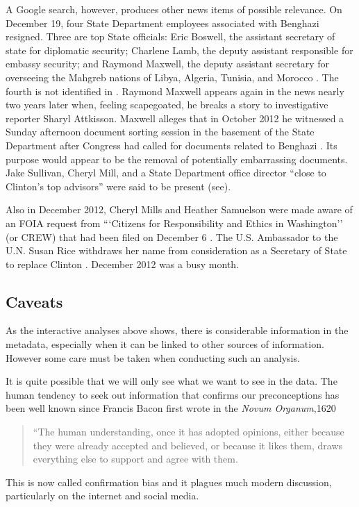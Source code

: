 \documentclass[journal]{vgtc}                %
\begin{document}
A Google search,  however, produces other news items of possible relevance.  On  December 19, four State Department employees associated with Benghazi resigned.  Three are top State officials: Eric Boswell,  the assistant secretary of state for diplomatic security;  Charlene Lamb, the deputy assistant responsible for embassy security; and Raymond Maxwell, the deputy assistant secretary for overseeing the Mahgreb nations of Libya, Algeria, Tunisia, and Morocco \cite{securityResigns, fourResign, tripoliPostResign}.  The fourth is not identified in \cite{fourResign, tripoliPostResign}.   Raymond Maxwell appears again in the news nearly two years later when, feeling scapegoated, he breaks a story to investigative reporter Sharyl Attkisson.  Maxwell alleges that in October 2012 he witnessed a Sunday afternoon document sorting session in the basement of the State Department after Congress had called for documents related to Benghazi \cite{AttkissonBenghaziBombshell, attkissonTimeline}.  Its purpose would appear to be the removal of potentially embarrassing documents.  Jake Sullivan,  Cheryl Mill, and a State Department office director ``close to Clinton's top advisors''  were said to be present (see\cite{AttkissonBenghaziBombshell}).

Also in December 2012, Cheryl Mills and Heather Samuelson were made aware of an FOIA request from ```Citizens for Responsibility and Ethics in Washington'' (or CREW) that had been filed on December 6 \cite{CREWFOIA, FOIAcall}.   The U.S. Ambassador to the U.N. Susan Rice withdraws her name from consideration as a Secretary of State to replace Clinton \cite{RiceWithdraws}.  December 2012 was a busy month.

\subsection{Caveats}
\label{sect:caveats}
As the interactive analyses above shows, there is considerable information in the metadata, especially when it can be linked to other sources of information.  However some care must be taken when conducting such an analysis.  

It is quite possible that we will only see what we want to see in the data.  The human tendency to seek out information that confirms our preconceptions has been well known since Francis Bacon first wrote in the \emph{Novum Organum},1620
\begin{quotation}
``The human understanding, once it has adopted opinions, either because they were already accepted and believed, or because it likes them, draws everything else to support and agree with them.
\end{quotation}
This is now called confirmation bias \cite{confBias} and it plagues much modern discussion, particularly on the internet and social media.  
\end{document}
